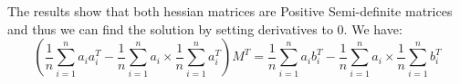 \documentclass[runningheads]{llncs}
\begin{document}
The results show that both hessian matrices are Positive Semi-definite matrices and thus we can find the solution by setting derivatives to 0. We have:
\begin{equation}
    (\frac{1}{n}\sum_{i=1}^na_ia_i^T - \frac{1}{n}\sum_{i=1}^na_i\times \frac{1}{n}\sum_{i=1}^na_i^T)M^T = \frac{1}{n}\sum_{i=1}^na_ib_i^T - \frac{1}{n}\sum_{i=1}^na_i\times \frac{1}{n}\sum_{i=1}^nb_i^T
\end{equation}




%
%
\end{document}
